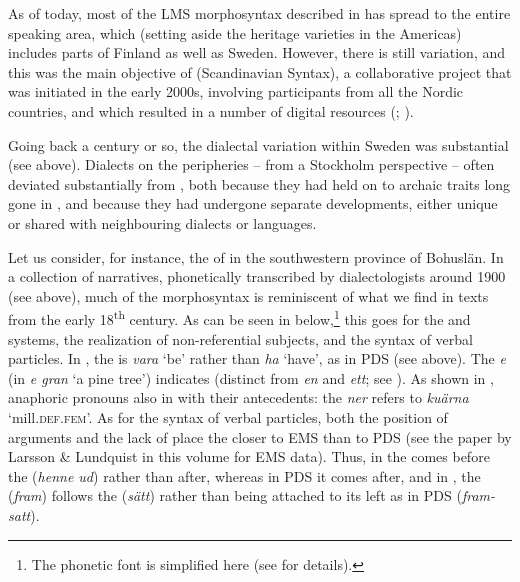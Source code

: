 \documentclass[output=paper]{langscibook}
\begin{document}
As of today, most of the LMS morphosyntax described in  has spread to the entire  speaking area, which (setting aside the heritage varieties in the Americas) includes parts of Finland as well as Sweden. However, there is still variation, and this was the main objective of  (Scandinavian  Syntax), a collaborative project that was initiated in the early 2000s, involving participants from all the Nordic countries, and which resulted in a number of digital resources (\citealt{JohannessenEtAl2009}; \citealt{LindstadEtAl2009}).



Going back a century or so, the dialectal variation within Sweden was substantial (see  above). Dialects on the peripheries – from a Stockholm perspective – often deviated substantially from , both because they had held on to archaic traits long gone in , and because they had undergone separate developments, either unique or shared with neighbouring dialects or languages.



Let us consider, for instance, the  of  in the southwestern province of Bohuslän. In a collection of  narratives, phonetically transcribed by dialectologists around 1900 (see  above), much of the morphosyntax is reminiscent of what we find in texts from the early 18\textsuperscript{th} century. As can be seen in  below,\footnote{The phonetic font is simplified here (see \citealt{Petzell2019,Petzell2020} for details).} this goes for the  and  systems, the realization of non-referential subjects, and the syntax of verbal particles. In , the  is \textit{vara} ‘be’ rather than \textit{ha} ‘have’, as in PDS (see  above). The  \textit{e} (in \textit{e gran} ‘a pine tree’) indicates   (distinct from  \textit{en} and  \textit{ett}; see ). As shown in , anaphoric pronouns also  in  with their antecedents: the   \textit{ner} refers to \textit{kuärna} ‘mill.\textsc{def}.\textsc{fem}’. As for the syntax of verbal particles, both the position of arguments and the lack of   place the   closer to EMS than to PDS (see the paper by Larsson \& Lundquist in this volume for EMS data). Thus, in  the  comes before the  (\textit{henne ud}) rather than after, whereas in PDS it comes after, and in , the  (\textit{fram}) follows the  (\textit{sätt}) rather than being attached to its left as in PDS (\textit{fram-satt}).
\end{document}
